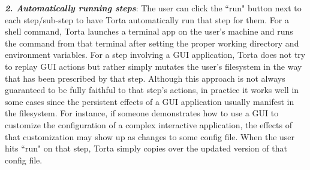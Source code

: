 \emph{\textbf{2. Automatically running steps}}: The user can click the
``run" button next to each step/sub-step to have Torta automatically run
that step for them.  For a shell command, Torta launches a terminal
app on the user's machine and runs the command from that terminal after
setting the proper working directory and environment variables. For a
step involving a GUI application, Torta does not try to replay GUI
actions but rather simply mutates the user's filesystem in the way that
has been prescribed by that step. Although this approach is not
always guaranteed to be fully faithful to that step's actions, in practice it
works well in some cases since the persistent effects of a GUI
application usually manifest in the filesystem. For instance, if someone
demonstrates how to use a GUI to customize the configuration of a
complex interactive application, the effects of that customization
may show up as changes to some config file. When the user hits
``run" on that step, Torta simply copies over the updated version of that
config file.
